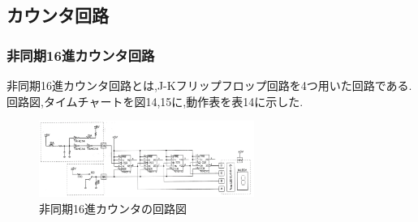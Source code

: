 \documentclass[twocolumn, 10pt,a4j]{jsarticle}
\begin{document}
\subsection{カウンタ回路}
  \subsubsection{非同期16進カウンタ回路}
  非同期16進カウンタ回路とは,J-Kフリップフロップ回路を4つ用いた回路である.
  回路図,タイムチャートを図14,15に,動作表を表14に示した.
  \begin{figure}[H]
    \begin{center}
      \includegraphics[width=7cm]{../img/junjokairo/hidouki_16sin_kairozu.png}
      \caption{非同期16進カウンタの回路図}
    \end{center}
  \end{figure}
\end{document}
